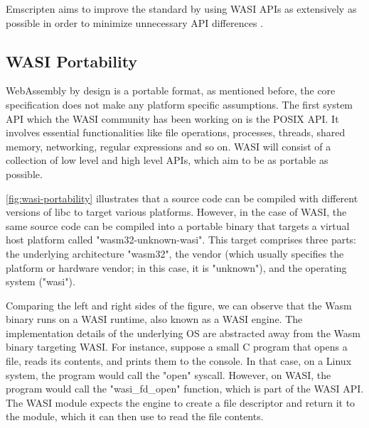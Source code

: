 Emscripten aims to improve the standard by using WASI APIs as extensively as possible in order to minimize unnecessary API differences \cite{zakai_2019_outside}. 

\subsection{WASI Portability}
\label{subsec:wasi-portability}

WebAssembly by design is a portable format, as mentioned before, the core specification does not make any platform specific assumptions. 
The first system API which the WASI community has been working on is the \gls{POSIX} API. 
It involves essential functionalities like file operations, processes, threads, 
shared memory, networking, regular expressions and so on. WASI will consist of a collection of low level and high level APIs, which aim to be as portable as possible. 

\autoref{fig:wasi-portability} illustrates that a source code can be compiled with different versions of \gls{libc} to target various platforms. However, in the case of WASI, the same source code can be compiled into a portable binary that targets a virtual host platform called "wasm32-unknown-wasi". 
This target comprises three parts: the underlying architecture "wasm32", the vendor (which usually specifies the platform or hardware vendor; in this case, it is "unknown"), and the operating system ("wasi").

Comparing the left and right sides of the figure, we can observe that the Wasm binary runs on a WASI runtime, also known as a WASI engine. The implementation details of the underlying OS are abstracted away from the Wasm binary targeting WASI. For instance, suppose a small C program that opens a file, reads its contents, and prints them to the console. In that case, on a Linux system, the program would call the "open" syscall. 
However, on WASI, the program would call the "wasi\_fd\_open" function, which is part of the WASI API. 
The WASI module expects the engine to create a file descriptor and return it to the module, which it can then use to read the file contents.

